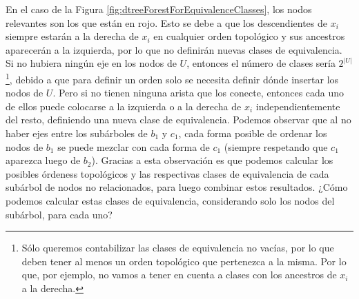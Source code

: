 En el caso de la Figura \ref{fig:dtreeForestForEquivalenceClasses}, los nodos relevantes son los que están en rojo. Esto se debe a que los descendientes de $x_i$ siempre estarán a la derecha de $x_i$ en cualquier orden topológico y sus ancestros aparecerán a la izquierda, por lo que no definirán nuevas clases de equivalencia. Si no hubiera ningún eje en los nodos de $U$, entonces el número de clases sería $2^{|U|}$ \footnote{Sólo queremos contabilizar las clases de equivalencia no vacías, por lo que deben tener al menos un orden topológico que pertenezca a la misma. Por lo que, por ejemplo, no vamos a tener en cuenta a clases con los ancestros de $x_i$ a la derecha.}, debido a que para definir un orden solo se necesita definir dónde insertar los nodos de $U$. Pero si no tienen ninguna arista que los conecte, entonces cada uno de ellos puede colocarse a la izquierda o a la derecha de $x_i$ independientemente del resto, definiendo una nueva clase de equivalencia. Podemos observar que al no haber ejes entre los subárboles de $b_1$ y $c_1$, cada forma posible de ordenar los nodos de $b_1$ se puede mezclar con cada forma de $c_1$ (siempre respetando que $c_1$ aparezca luego de $b_2$). Gracias a esta observación es que podemos calcular los posibles órdeness topológicos y las respectivas clases de equivalencia de cada subárbol de nodos no relacionados, para luego combinar estos resultados. ¿Cómo podemos calcular estas clases de equivalencia, considerando solo los nodos del subárbol, para cada uno?


